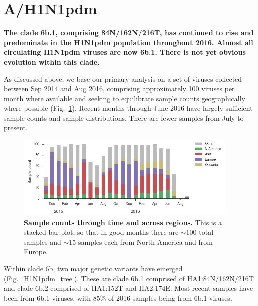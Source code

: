 \documentclass[11pt,oneside,letterpaper]{article}
\begin{document}
\clearpage
\pagebreak

\section*{A/H1N1pdm}

\textbf{The clade 6b.1, comprising 84N/162N/216T, has continued to rise and predominate in the H1N1pdm population throughout 2016. Almost all circulating H1N1pdm viruses are now 6b.1. There is not yet obvious evolution within this clade.}

As discussed above, we base our primary analysis on a set of viruses collected between Sep 2014 and Aug 2016, comprising approximately 100 viruses per month where available and seeking to equilibrate sample counts geographically where possible (Fig.\ \ref{H1N1pdm_counts}). Recent months through June 2016 have largely sufficient sample counts and sample distributions. There are fewer samples from July to present.

\begin{figure}[H]
	\centering
	\includegraphics[width=0.95\textwidth]{../figures/sep-2016/H1N1pdm_counts.png}
	\caption{\textbf{Sample counts through time and across regions.}
	This is a stacked bar plot, so that in good months there are $\sim$100 total samples and $\sim$15 samples each from North America and from Europe.
	}
	\label{H1N1pdm_counts}
\end{figure}

\pagebreak

Within clade 6b, two major genetic variants have emerged (Fig.\ \ref{H1N1pdm_tree}). These are clade 6b.1 comprised of HA1:84N/162N/216T and clade 6b.2 comprised of HA1:152T and HA2:174E. Most recent samples have been from 6b.1 viruses, with 85\% of 2016 samples being from 6b.1 viruses.
\end{document}
